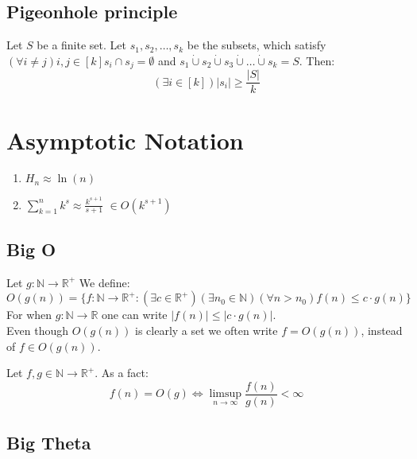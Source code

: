 \documentclass{article}
\newenvironment{definition}[1]{%
    \trivlist
    \item[\hskip\labelsep\textbf{Definition. #1.}]
    \ignorespaces
}{%
    \endtrivlist
}
\newenvironment{fact}[1]{%
    \trivlist
    \item[\hskip\labelsep\textbf{Fact. #1.}]
    \ignorespaces
}{%
    \endtrivlist
}
\begin{document}
\subsection{Pigeonhole principle}

\begin{definition}{Pigeonhole principle}
    Let $S$ be a finite set. Let $s_1, s_2, \dots, s_k$ be the subsets, which satisfy $\left(\forall i\neq j\right) i,j\in[k] s_i \cap s_j = \emptyset$ and $s_1 \dot\cup s_2 \dot\cup s_3 \dot\cup \dots \dot\cup s_k = S$. Then:
    \[\left(\exists i\in[k]\right) |s_i| \geq \frac{|S|}{k} \]
\end{definition}

\section{Asymptotic Notation}

\begin{enumerate}
    \item \(H_n \approx \ln(n)\)
    \item \(\sum_{k=1}^{n} k^s \approx \frac{k^{s+1}}{s+1}\) \(\in O(k^{s+1})\)
\end{enumerate}

\subsection{Big O}

\begin{definition}{Big O Asymptotic Notation}
    Let $g: \mathbb{N}\rightarrow \mathbb{R}^{+}$ We define:
    \[O\left(g(n)\right) = \{f:\mathbb{N}\rightarrow \mathbb{R}^{+} : \left(\exists c\in\mathbb{R}^{+}\right) \left(\exists n_0\in\mathbb{N}\right) \left(\forall n>n_0\right) f(n) \leq c\cdot g(n)\}\]
    For when $g: \mathbb{N}\rightarrow \mathbb{R}$ one can write $|f(n)| \leq |c\cdot g(n)|$.\\
    Even though $O(g(n))$ is clearly a set we often write $f=O(g(n))$, instead of $f\in O(g(n))$.
\end{definition}

\begin{fact}{Big O Limit}
    Let $f,g \in\mathbb{N}\rightarrow\mathbb{R}^{+}$. As a fact:
    \[f(n)=O(g) \iff \limsup_{n\rightarrow\infty} \frac{f(n)}{g(n)} < \infty\]
\end{fact}

\subsection{Big Theta}
\end{document}
